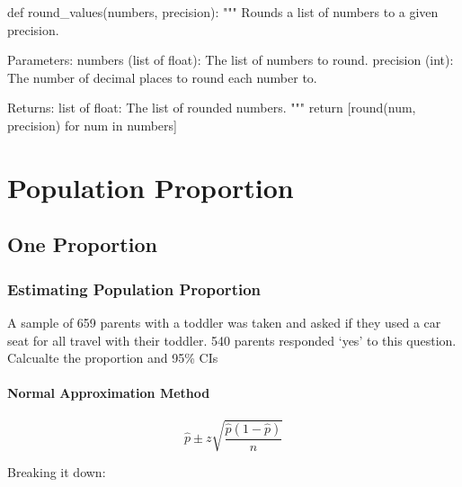 \documentclass[
  letterpaper,
  DIV=11,
  numbers=noendperiod]{scrartcl}
\let\oldparagraph\paragraph
\renewcommand{\paragraph}[1]{\oldparagraph{#1}\mbox{}}
\newenvironment{Shaded}{\begin{snugshade}}{\end{snugshade}}
\newcommand{\BuiltInTok}[1]{\textcolor[rgb]{0.00,0.23,0.31}{#1}}
\newcommand{\CommentTok}[1]{\textcolor[rgb]{0.37,0.37,0.37}{#1}}
\newcommand{\ControlFlowTok}[1]{\textcolor[rgb]{0.00,0.23,0.31}{#1}}
\newcommand{\KeywordTok}[1]{\textcolor[rgb]{0.00,0.23,0.31}{#1}}
\newcommand{\NormalTok}[1]{\textcolor[rgb]{0.00,0.23,0.31}{#1}}
\begin{document}
\begin{Shaded}
\begin{Highlighting}[]
\KeywordTok{def}\NormalTok{ round\_values(numbers, precision):}
    \CommentTok{"""}
\CommentTok{    Rounds a list of numbers to a given precision.}

\CommentTok{    Parameters:}
\CommentTok{    numbers (list of float): The list of numbers to round.}
\CommentTok{    precision (int): The number of decimal places to round each number to.}

\CommentTok{    Returns:}
\CommentTok{    list of float: The list of rounded numbers.}
\CommentTok{    """}
    \ControlFlowTok{return}\NormalTok{ [}\BuiltInTok{round}\NormalTok{(num, precision) }\ControlFlowTok{for}\NormalTok{ num }\KeywordTok{in}\NormalTok{ numbers]}
\end{Highlighting}
\end{Shaded}

\hypertarget{population-proportion}{%
\section{Population Proportion}\label{population-proportion}}

\hypertarget{one-proportion}{%
\subsection{One Proportion}\label{one-proportion}}

\hypertarget{estimating-population-proportion}{%
\subsubsection{Estimating Population
Proportion}\label{estimating-population-proportion}}

A sample of 659 parents with a toddler was taken and asked if they used
a car seat for all travel with their toddler. 540 parents responded
`yes' to this question. Calcualte the proportion and 95\% CIs

\hypertarget{normal-approximation-method}{%
\paragraph{Normal Approximation
Method}\label{normal-approximation-method}}

\[
\hat{p} \pm z \sqrt{\frac{\hat{p}(1 - \hat{p})}{n}}
\]

Breaking it down:
\end{document}

